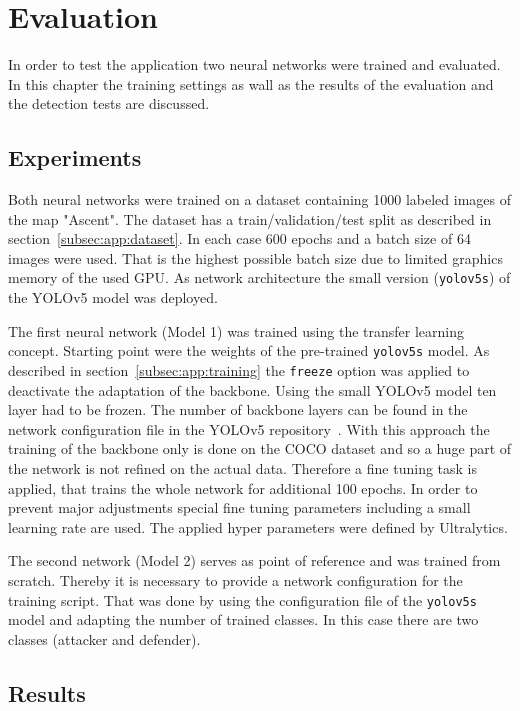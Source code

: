\chapter{Evaluation}\label{chpt:evaluation}
\glsresetall

In order to test the application two neural networks were trained and evaluated. In this chapter the 
training settings as wall as the results of the evaluation and the detection tests are discussed.

\section{Experiments}\label{sec:eval:experiments}

Both neural networks were trained on a dataset containing 1000 labeled images of the map 
"Ascent". The dataset has a train/validation/test split as described in 
section~\ref{subsec:app:dataset}. In each case 600 epochs and a batch size of 64 images were 
used. That is the highest possible batch size due to limited graphics memory of the used GPU. As 
network architecture the small version (\texttt{yolov5s}) of the YOLOv5 model was deployed.

The first neural network (Model 1) was trained using the transfer learning concept. Starting 
point were the weights of the pre-trained \texttt{yolov5s} model. As described in 
section~\ref{subsec:app:training} the \texttt{freeze} option was applied to deactivate the adaptation 
of the backbone. Using the small YOLOv5 model ten layer had to be frozen. The number of 
backbone layers can be found in the network configuration file in the YOLOv5 
repository~\cite{jocher2020}. With this approach the training of the backbone only is done on the 
COCO dataset and so a huge part of the network is not refined on the actual data. Therefore a fine 
tuning task is applied, that trains the whole network for additional 100 epochs. In order to prevent 
major adjustments special fine tuning parameters including a small learning rate are used. The 
applied hyper parameters were defined by Ultralytics.

The second network (Model 2) serves as point of reference and was trained from scratch. Thereby it 
is necessary to provide a network configuration for the training script. That was done by using the 
configuration file of the \texttt{yolov5s} model and adapting the number of trained classes. In this 
case there are two classes (attacker and defender).

\section{Results}\label{sec:eval:results}

